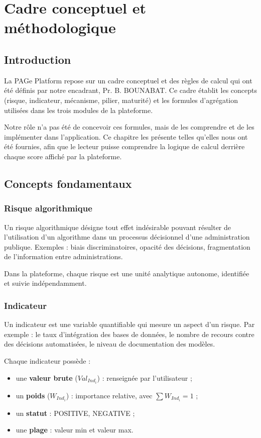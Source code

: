\chapter{Cadre conceptuel et méthodologique}

\section{Introduction}
La PAGe Platform repose sur un cadre conceptuel et des règles de calcul qui ont été définis par notre encadrant, Pr. B. BOUNABAT. Ce cadre établit les concepts (risque, indicateur, mécanisme, pilier, maturité) et les formules d'agrégation utilisées dans les trois modules de la plateforme.

Notre rôle n'a pas été de concevoir ces formules, mais de les comprendre et de les implémenter dans l'application. Ce chapitre les présente telles qu'elles nous ont été fournies, afin que le lecteur puisse comprendre la logique de calcul derrière chaque score affiché par la plateforme.

\section{Concepts fondamentaux}

\subsection{Risque algorithmique}
Un risque algorithmique désigne tout effet indésirable pouvant résulter de l'utilisation d'un algorithme dans un processus décisionnel d'une administration publique. Exemples : biais discriminatoires, opacité des décisions, fragmentation de l'information entre administrations.

Dans la plateforme, chaque risque est une unité analytique autonome, identifiée et suivie indépendamment.

\subsection{Indicateur}
Un indicateur est une variable quantifiable qui mesure un aspect d'un risque. Par exemple : le taux d'intégration des bases de données, le nombre de recours contre des décisions automatisées, le niveau de documentation des modèles.

Chaque indicateur possède :
\begin{itemize}
    \item une \textbf{valeur brute} ($Val_{Ind_i}$) : renseignée par l'utilisateur ;
    \item un \textbf{poids} ($W_{Ind_i}$) : importance relative, avec $\sum W_{Ind_i} = 1$ ;
    \item un \textbf{statut} : POSITIVE, NEGATIVE ;
    \item une \textbf{plage} : valeur min et valeur max.
\end{itemize}

